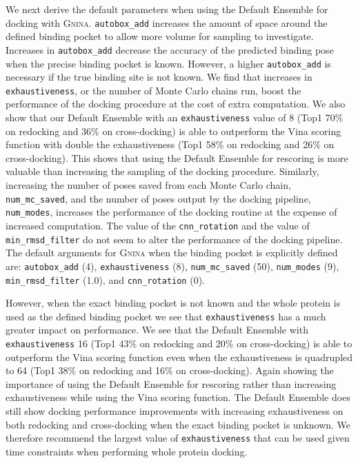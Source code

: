 \documentclass[journal=jcisd8,manuscript=article]{achemso}
\begin{document}
We next derive the default parameters when using the Default Ensemble for docking with \textsc{Gnina}. \texttt{autobox\_add} increases the amount of space around the defined binding pocket to allow more volume for sampling to investigate. Increases in \texttt{autobox\_add} decrease the accuracy of the predicted binding pose when the precise binding pocket is known. However, a higher \texttt{autobox\_add} is necessary if the true binding site is not  known. We find that increases in \texttt{exhaustiveness}, or the number of Monte Carlo chains run, boost the performance of the docking procedure at the cost of extra computation. We also show that our Default Ensemble with an \texttt{exhaustiveness} value of 8 (Top1 70\% on redocking and 36\% on cross-docking) is able to outperform the Vina scoring function with double the exhaustiveness (Top1 58\% on redocking and 26\% on cross-docking). This shows that using the Default Ensemble for rescoring is more valuable than increasing the sampling of the docking procedure. Similarly, increasing the number of poses saved from each Monte Carlo chain, \texttt{num\_mc\_saved}, and the number of poses output by the docking pipeline, \texttt{num\_modes}, increases the performance of the docking routine at the expense of increased computation. The value of the \texttt{cnn\_rotation} and the value of \texttt{min\_rmsd\_filter} do not seem to alter the performance of the docking pipeline. The default arguments for \textsc{Gnina} when the binding pocket is explicitly defined are: \texttt{autobox\_add} (4), \texttt{exhaustiveness} (8), \texttt{num\_mc\_saved} (50), \texttt{num\_modes} (9), \texttt{min\_rmsd\_filter} (1.0), and \texttt{cnn\_rotation} (0). 

However, when the exact binding pocket is not known and the whole protein is used as the defined binding pocket we see that \texttt{exhaustiveness} has a much greater impact on performance. We see that the Default Ensemble with \texttt{exhaustiveness} 16 (Top1 43\% on redocking and 20\% on cross-docking) is able to outperform the Vina scoring function even when the exhaustiveness is quadrupled to 64 (Top1 38\% on redocking and 16\% on cross-docking). Again showing the importance of using the Default Ensemble for rescoring rather than increasing exhaustiveness while using the Vina scoring function. The Default Ensemble does still show docking performance improvements with increasing exhaustiveness on both redocking and cross-docking when the exact binding pocket is unknown. We therefore recommend the largest value of \texttt{exhaustiveness} that can be used given time constraints when performing whole protein docking.
\end{document}

